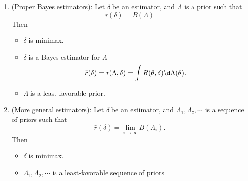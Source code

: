 \documentclass[a4paper]{article}
\begin{document}
\newpage
\begin{thm}
	\quad
	\begin{enumerate}
		\item (Proper Bayes estimators): Let $\delta$ be an estimator, and $\Lambda$ is a prior such that
		\begin{equation}
			\bar{r}(\delta) = B(\Lambda)
		\end{equation}
		Then
		\begin{itemize}
			\item $\delta$ is minimax.
			\item $\delta$ is a Bayes estimator for $\Lambda$
			\begin{equation*}
				\bar{r}(\delta) = r(\Lambda,\delta) = \int R(\theta,\delta) \d \Lambda(\theta).
			\end{equation*}
			\item $\Lambda$ is a least-favorable prior. 
		\end{itemize}
		\item (More general estimators): Let $\delta$ be an estimator, and $\Lambda_1,\Lambda_2,\cdots$ is a sequence of priors such that
		\begin{equation}
			\bar{r}(\delta) = \lim\limits_{i \to \infty} B(\Lambda_i).
		\end{equation}
		Then
		\begin{itemize}
			\item $\delta$ is minimax.
			\item $\Lambda_1,\Lambda_2,\cdots$ is a least-favorable sequence of priors. 
		\end{itemize}
	\end{enumerate}
\end{thm}
\end{document}
